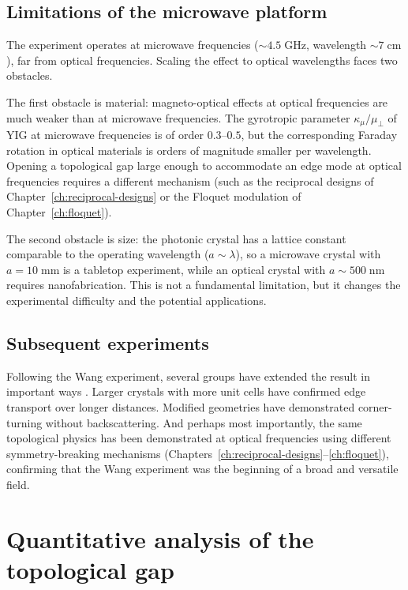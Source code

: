 \subsection{Limitations of the microwave platform}
\label{sec:ch9-limitations}

The experiment operates at microwave frequencies ($\sim 4.5\;\mathrm{GHz}$,
wavelength $\sim 7\;\mathrm{cm}$), far from optical frequencies.
Scaling the effect to optical wavelengths faces two obstacles.

The first obstacle is material: magneto-optical effects at optical
frequencies are much weaker than at microwave frequencies.  The
gyrotropic parameter $\kappa_\mu/\mu_\perp$ of YIG at microwave
frequencies is of order $0.3$--$0.5$, but the corresponding Faraday
rotation in optical materials is orders of magnitude smaller per
wavelength.  Opening a topological gap large enough to accommodate an
edge mode at optical frequencies requires a different mechanism (such as
the reciprocal designs of Chapter~\ref{ch:reciprocal-designs} or the
Floquet modulation of Chapter~\ref{ch:floquet}).

The second obstacle is size: the photonic crystal has a lattice constant
comparable to the operating wavelength ($a\sim\lambda$), so a microwave
crystal with $a=10\;\mathrm{mm}$ is a tabletop experiment, while an
optical crystal with $a\sim 500\;\mathrm{nm}$ requires nanofabrication.
This is not a fundamental limitation, but it changes the experimental
difficulty and the potential applications.

\subsection{Subsequent experiments}
\label{sec:ch9-subsequent}

Following the Wang experiment, several groups have extended the result
in important ways \cite{ozawa2018topological,price2022roadmap}.  Larger crystals with more unit cells have confirmed
edge transport over longer distances.  Modified geometries have
demonstrated corner-turning without backscattering.  And perhaps most
importantly, the same topological physics has been demonstrated at
optical frequencies using different symmetry-breaking mechanisms
(Chapters~\ref{ch:reciprocal-designs}--\ref{ch:floquet}), confirming
that the Wang experiment was the beginning of a broad and versatile
field.

\section{Quantitative analysis of the topological gap}
\label{sec:ch9-gap-analysis}

